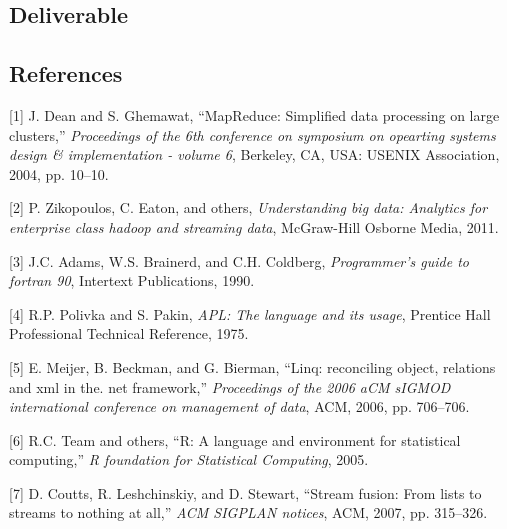 \subsection{Deliverable}\label{deliverable}

\subsection{References}\label{references}

{[}1{]} J. Dean and S. Ghemawat, ``MapReduce: Simplified data processing
on large clusters,'' \emph{Proceedings of the 6th conference on
symposium on opearting systems design \& implementation - volume 6},
Berkeley, CA, USA: USENIX Association, 2004, pp. 10--10.

{[}2{]} P. Zikopoulos, C. Eaton, and others, \emph{Understanding big
data: Analytics for enterprise class hadoop and streaming data},
McGraw-Hill Osborne Media, 2011.

{[}3{]} J.C. Adams, W.S. Brainerd, and C.H. Coldberg, \emph{Programmer's
guide to fortran 90}, Intertext Publications, 1990.

{[}4{]} R.P. Polivka and S. Pakin, \emph{APL: The language and its
usage}, Prentice Hall Professional Technical Reference, 1975.

{[}5{]} E. Meijer, B. Beckman, and G. Bierman, ``Linq: reconciling
object, relations and xml in the. net framework,'' \emph{Proceedings of
the 2006 aCM sIGMOD international conference on management of data},
ACM, 2006, pp. 706--706.

{[}6{]} R.C. Team and others, ``R: A language and environment for
statistical computing,'' \emph{R foundation for Statistical Computing},
2005.

{[}7{]} D. Coutts, R. Leshchinskiy, and D. Stewart, ``Stream fusion:
From lists to streams to nothing at all,'' \emph{ACM SIGPLAN notices},
ACM, 2007, pp. 315--326.
